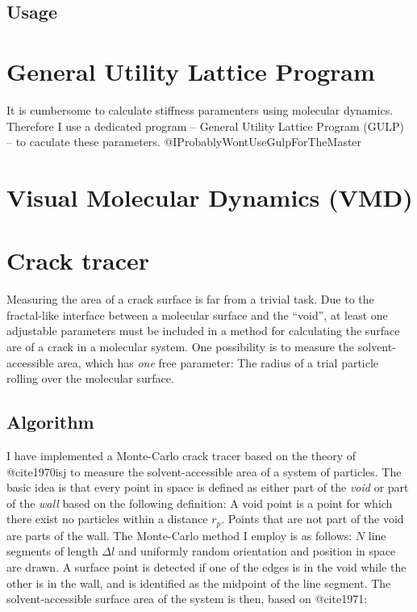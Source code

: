 \subsection{Usage}

\section{General Utility Lattice Program}
It is cumbersome to calculate stiffness paramenters using molecular dynamics. Therefore I use a dedicated program -- General Utility Lattice Program (GULP) -- to caculate these parameters. @IProbablyWontUseGulpForTheMaster

\section{Visual Molecular Dynamics (VMD)}


\section{Crack tracer}
Measuring the area of a crack surface is far from a trivial task. Due to the fractal-like interface between a molecular surface and the ``void'', at least one adjustable parameters must be included in a method for calculating the surface are of a crack in a molecular system. One possibility is to measure the solvent-accessible area, which has \emph{one} free parameter: The radius of a trial particle rolling over the molecular surface. 


\subsection{Algorithm}
I have implemented a Monte-Carlo crack tracer based on the theory of @cite1970isj to measure the solvent-accessible area of a system of particles. The basic idea is that every point in space is defined as either part of the \emph{void} or part of the \emph{wall} based on the following definition: A void point is a point for which there exist no particles within a distance $r_p$. Points that are not part of the void are parts of the wall. The Monte-Carlo method I employ is as follows: $N$ line segments of length $\Delta l$ and uniformly random orientation and position in space are drawn. A surface point is detected if one of the edges is in the void while the other is in the wall, and is identified as the midpoint of the line segment. The solvent-accessible surface area of the system is then, based on @cite1971:

